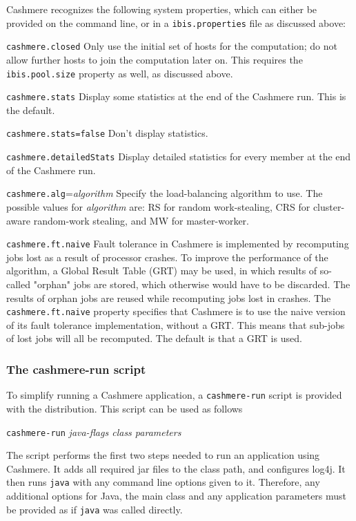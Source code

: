 \documentclass[a4paper,10pt]{article}
\begin{document}
Cashmere recognizes the following system properties, which can either
be provided on the command line, or in a \texttt{ibis.properties} file
as discussed above:
\begin{description}
\item{\texttt{cashmere.closed}}
Only use the initial set of hosts for the computation; do not allow
further hosts to join the computation later on. This requires the
\texttt{ibis.pool.size} property as well, as discussed above.
\item{\texttt{cashmere.stats}}
Display some statistics at the end of the Cashmere run. This is the default.
\item{\texttt{cashmere.stats=false}}
Don't display statistics.
\item{\texttt{cashmere.detailedStats}}
Display detailed statistics for every member at the end of the Cashmere run.
\item{\texttt{cashmere.alg}=\emph{algorithm}}
Specify the load-balancing algorithm to use. The possible values for
\emph{algorithm} are: RS for random work-stealing, CRS for cluster-aware
random-work stealing, and MW for master-worker.
\item{\texttt{cashmere.ft.naive}}
Fault tolerance in Cashmere is implemented by recomputing jobs lost as a
result of processor crashes.
To improve the performance of the
algorithm, a Global Result Table (GRT) may be used, in which results of
so-called "orphan" jobs are stored, which otherwise would have to be discarded.
The results of orphan jobs are reused while recomputing jobs lost in
crashes. The \texttt{cashmere.ft.naive} property specifies that Cashmere is
to use the naive version of its fault tolerance implementation, without
a GRT. This means that sub-jobs of lost jobs will all be recomputed.
The default is that a GRT is used.
\end{description}

\subsubsection{The cashmere-run script}

To simplify running a Cashmere application, a \texttt{cashmere-run} script is
provided with the distribution. This script can be
used as follows

\begin{center}
\texttt{cashmere-run} \emph{java-flags class parameters}
\end{center}

The script performs the first two steps needed to run an application
using Cashmere. It adds all required jar files
to the class path, and configures log4j.
It then runs \texttt{java} with any
command line options given to it. Therefore, any additional options for
Java, the main class and any application parameters must be provided as
if \texttt{java} was called directly.
\end{document}
